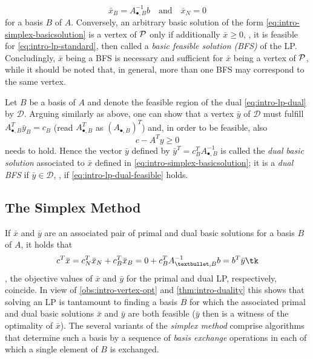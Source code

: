 \begin{equation}\label{eq:intro-simplex-basicsolution}
  \bar x_B = A_{•,B}^{-1} b\quad\text{and}\quad \bar x_N = 0
\end{equation}
for a basis $B$ of $A$. Conversely, an arbitrary basic solution of the form \cref{eq:intro-simplex-basicsolution} is a vertex of $\P$ only if additionally $\bar x ≥ 0$, \ie, it is feasible for \cref{eq:intro-lp-standard}, then called a \emph{basic feasible solution (BFS)} of the LP. Concludingly, $\bar x$ being a BFS is necessary and sufficient for $\bar x$ being a vertex of $\P$, while it should be noted that, in general, more than one BFS may correspond to the same vertex.

Let $B$ be a basis of $A$ and denote the feasible region of the dual \cref{eq:intro-lp-dual} by $\mathcal D$. Arguing similarly as above, one can show that a vertex $\bar y$ of $\mathcal D$ must fulfill $A^T_{•,B}\bar y_B=c_B$ (read $A^T_{•,B}$ as $(A_{•,B})^T$) and, in order to be feasible, also
\begin{equation}\label{eq:intro-lp-dual-feasible}
  c-A^T y ≥ 0
\end{equation}
needs to hold. Hence the vector $\bar y$ defined by $\bar y^T = c_B^T A_{•,B}^{-1}$ is called the \emph{dual basic solution} associated to $\bar x$ defined in \cref{eq:intro-simplex-basicsolution}; it is a \emph{dual BFS} if $\bar y ∈ \mathcal D$, \ie, if \cref{eq:intro-lp-dual-feasible} holds.

\subsection{The Simplex Method}
If $\bar x$ and $\bar y$ are an associated pair of primal and dual basic solutions for a basis $B$ of $A$, it holds that
\[ c^T \bar x = c_N^T \bar x_N + c_B^T \bar x_B = 0 + c_B^T A_{•,B}^{-1} b = b^T\bar y \tk\]
\ie, the objective values of $\bar x$ and $\bar y$ for the primal and dual LP, respectively, coincide. In view of \cref{obs:intro-vertex-opt} and \cref{thm:intro-duality} this shows that solving an LP is tantamount to finding a basis $B$ for which the associated primal and dual basic solutions $\bar x$ and $\bar y$ are both feasible ($\bar y$ then is a witness of the optimality of $\bar x$). The several variants of the \emph{simplex method} comprise algorithms that determine such a basis by a sequence of \emph{basis exchange} operations in each of which a single element of $B$ is exchanged.

